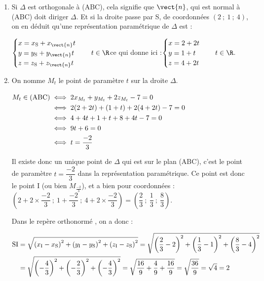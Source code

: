 \begin{enumerate}
\begin{enumerate}
	De plus, $\aligned[t] \mathrm{A} \in (\mathrm{ABC}) &\iff 2x_{\mathrm{A}} + y_{\mathrm{A}} + 2z_{\mathrm{A}} + d = 0\\
	&\iff 2\times 3 + (-1) + 2\times 1 + d = 0\\
	&\iff 6 - 1 + 2 + d = 0\\
	&\iff d = -7\endaligned$

	Finalement, une équation de (ABC) est :\quad$2x + y + 2z - 7 = 0$.

	\item Si $\Delta$ est orthogonale à (ABC), cela signifie que $\vect{n}$, qui est normal à (ABC) doit diriger $\Delta$. Et si la droite passe par S, de coordonnées $(2 ~;~ 1 ~;~ 4)$, on en déduit qu'une représentation paramétrique de $\Delta$ est :

	$\begin{cases}x = x_{\mathrm{S}} + x_{\vect{n}}t\\y = y_{\mathrm{S}} + y_{\vect{n}}t\\z = z_{\mathrm{S}} + z_{\vect{n}}t\\	\end{cases} \quad t \in \R$\quad ce qui donne ici :\quad $\begin{cases}x  = 2 + 2t\\y=1+t\\z=4+2t\end{cases} \quad t \in \R$.

	\item On nomme $M_t$ le point de paramètre $t$ sur la droite $\Delta$.

	$\aligned[t] M_t \in (\mathrm{ABC}) &\iff 2x_{M_{t}} + y_{M_{t}} + 2z_{M_{t}} - 7 = 0\\
	&\iff 2(2 + 2t) + (1 + t) + 2(4 + 2t) - 7 = 0\\
	&\iff 4 + 4t + 1 + t + 8 + 4t - 7 = 0\\
	&\iff 9t + 6 = 0\\
	&\iff t = \dfrac{-2}{3}\endaligned$

	Il existe donc un unique point de $\Delta$ qui est sur le plan (ABC), c'est le point de paramètre $t=\dfrac{-2}{3}$ dans la représentation paramétrique. Ce point est donc le point I (ou bien $M_{\frac{-2}{3}}$), et a bien pour coordonnées : $\left(2 + 2\times \dfrac{-2}{3} ~;~ 1 + \dfrac{-2}{3}~;~ 4 + 2\times \dfrac{-2}{3}\right)  = \left(\dfrac{2}{3} ~;~ \dfrac{1}{3} ~;~ \dfrac{8}{3}\right)$.

	Dans le repère orthonormé \Oijk{}, on a donc :

	$\aligned[t] \mathrm{SI} &= \sqrt{\left(x_\mathrm{I} - x_{\mathrm{S}}\right)^2 +\left(y_\mathrm{I} - y_{\mathrm{S}}\right)^2 +\left(z_\mathrm{I} - z_{\mathrm{S}}\right)^2 } = \sqrt{\left(\dfrac{2}{3}-2\right)^2 + \left(\dfrac{1}{3} - 1\right)^2 + \left(\dfrac{8}{3} - 4\right)^2   } \\
	&=\sqrt{\left(-\dfrac{4}{3}\right)^2 + \left(-\dfrac{2}{3}\right)^2 + \left(-\dfrac{4}{3}\right)^2  } = \sqrt{\dfrac{16}{9}+\dfrac{4}{9} + \dfrac{16}{9}} = \sqrt{\dfrac{36}{9}} = \sqrt{4} = 2 \endaligned$


\end{enumerate}
\end{enumerate}
